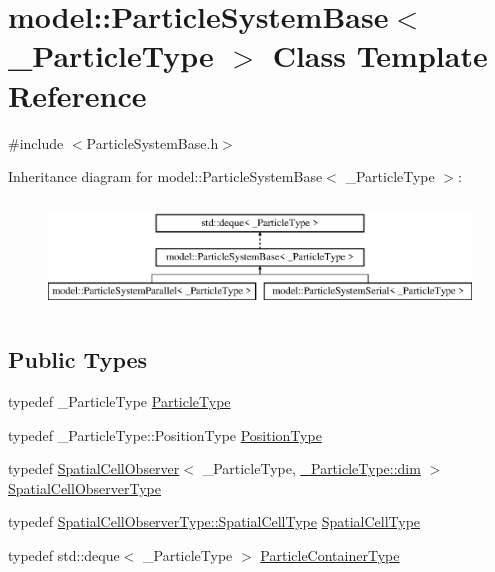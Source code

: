 \hypertarget{classmodel_1_1_particle_system_base}{}\section{model\+:\+:Particle\+System\+Base$<$ \+\_\+\+Particle\+Type $>$ Class Template Reference}
\label{classmodel_1_1_particle_system_base}


{\ttfamily \#include $<$Particle\+System\+Base.\+h$>$}

Inheritance diagram for model\+:\+:Particle\+System\+Base$<$ \+\_\+\+Particle\+Type $>$\+:\begin{figure}[H]
\begin{center}
\leavevmode
\includegraphics[height=2.926829cm]{classmodel_1_1_particle_system_base}
\end{center}
\end{figure}
\subsection*{Public Types}
\begin{DoxyCompactItemize}
\item 
typedef \+\_\+\+Particle\+Type \hyperlink{classmodel_1_1_particle_system_base_a3a4f5423639021d769ab7d4cfbf246c3}{Particle\+Type}
\item 
typedef \+\_\+\+Particle\+Type\+::\+Position\+Type \hyperlink{classmodel_1_1_particle_system_base_ab0a407d587b9779443f0b45e55185002}{Position\+Type}
\item 
typedef \hyperlink{structmodel_1_1_spatial_cell_observer}{Spatial\+Cell\+Observer}$<$ \+\_\+\+Particle\+Type, \hyperlink{plot_nd_a_8m_a382f3ca768b275b8d563604f7fc7df73}{\+\_\+\+Particle\+Type\+::dim} $>$ \hyperlink{classmodel_1_1_particle_system_base_a6577788626cdac7c3596faf05f9f30f2}{Spatial\+Cell\+Observer\+Type}
\item 
typedef \hyperlink{structmodel_1_1_spatial_cell_observer_a276f0ef902c63265b8236fb591d8a1f9}{Spatial\+Cell\+Observer\+Type\+::\+Spatial\+Cell\+Type} \hyperlink{classmodel_1_1_particle_system_base_a8de0382d851a8968d757f91bad3a408e}{Spatial\+Cell\+Type}
\item 
typedef std\+::deque$<$ \+\_\+\+Particle\+Type $>$ \hyperlink{classmodel_1_1_particle_system_base_ac95d9a819d1da5e86f726494bf6df504}{Particle\+Container\+Type}
\end{DoxyCompactItemize}
